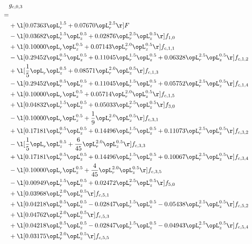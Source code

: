 \begin{alignat}{2} 
\label{eq:g_03_0} 
& g_{c,0,3} \nonumber \\ 
 = \\ 
& + \l[  0.07363 \opL_r^{1.5} +  0.07670 \opL_r^{2.5}  \r] F \nonumber \\ 
& - \l[  0.03682 \opL_r^{1.5} \opL_z^{0.5} +  0.02876 \opL_r^{2.5} \opL_z^{0.5}  \r] f_{1,0} \nonumber \\ 
& + \l[  0.10000 \opL_r \opL_z^{0.5} +  0.07143 \opL_r^{2.0} \opL_z^{0.5}  \r] f_{c,1,1} \nonumber \\ 
& - \l[  0.29452 \opL_r^{0.5} \opL_z^{0.5} +  0.11045 \opL_r^{1.5} \opL_z^{0.5} +  0.06328 \opL_r^{2.5} \opL_z^{0.5}  \r] f_{c,1,2} \nonumber \\ 
& + \l[ \frac{1}{5} \opL_r \opL_z^{0.5} +  0.08571 \opL_r^{2.0} \opL_z^{0.5}  \r] f_{c,1,3} \nonumber \\ 
& - \l[  0.29452 \opL_r^{0.5} \opL_z^{0.5} +  0.11045 \opL_r^{1.5} \opL_z^{0.5} +  0.05752 \opL_r^{2.5} \opL_z^{0.5}  \r] f_{c,1,4} \nonumber \\ 
& + \l[  0.10000 \opL_r \opL_z^{0.5} +  0.05714 \opL_r^{2.0} \opL_z^{0.5}  \r] f_{c,1,5} \nonumber \\ 
& + \l[  0.04832 \opL_r^{1.5} \opL_z^{0.5} +  0.05033 \opL_r^{2.5} \opL_z^{0.5}  \r] f_{3,0} \nonumber \\ 
& - \l[  0.10000 \opL_r \opL_z^{0.5} + \frac{1}{9} \opL_r^{2.0} \opL_z^{0.5}  \r] f_{c,3,1} \nonumber \\ 
& + \l[  0.17181 \opL_r^{0.5} \opL_z^{0.5} +  0.14496 \opL_r^{1.5} \opL_z^{0.5} +  0.11073 \opL_r^{2.5} \opL_z^{0.5}  \r] f_{c,3,2} \nonumber \\ 
& - \l[ \frac{1}{5} \opL_r \opL_z^{0.5} + \frac{6}{45} \opL_r^{2.0} \opL_z^{0.5}  \r] f_{c,3,3} \nonumber \\ 
& + \l[  0.17181 \opL_r^{0.5} \opL_z^{0.5} +  0.14496 \opL_r^{1.5} \opL_z^{0.5} +  0.10067 \opL_r^{2.5} \opL_z^{0.5}  \r] f_{c,3,4} \nonumber \\ 
& - \l[  0.10000 \opL_r \opL_z^{0.5} + \frac{4}{45} \opL_r^{2.0} \opL_z^{0.5}  \r] f_{c,3,5} \nonumber \\ 
& - \l[  0.00949 \opL_r^{1.5} \opL_z^{0.5} +  0.02472 \opL_r^{2.5} \opL_z^{0.5}  \r] f_{5,0} \nonumber \\ 
& + \l[  0.03968 \opL_r^{2.0} \opL_z^{0.5}  \r] f_{c,5,1} \nonumber \\ 
& + \l[  0.04218 \opL_r^{0.5} \opL_z^{0.5}   -0.02847 \opL_r^{1.5} \opL_z^{0.5}   -0.05438 \opL_r^{2.5} \opL_z^{0.5}  \r] f_{c,5,2} \nonumber \\ 
& + \l[  0.04762 \opL_r^{2.0} \opL_z^{0.5}  \r] f_{c,5,3} \nonumber \\ 
& + \l[  0.04218 \opL_r^{0.5} \opL_z^{0.5}   -0.02847 \opL_r^{1.5} \opL_z^{0.5}   -0.04943 \opL_r^{2.5} \opL_z^{0.5}  \r] f_{c,5,4} \nonumber \\ 
& + \l[  0.03175 \opL_r^{2.0} \opL_z^{0.5}  \r] f_{c,5,5} \nonumber \\ 
\end{alignat} 


